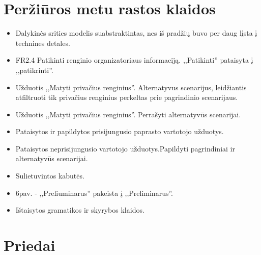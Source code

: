 \documentclass{VUMIFPSkursinis}
\begin{document}
    \section{Peržiūros metu rastos klaidos} \label{klaidos}
		\begin{itemize}
			\item Dalykinės srities modelis suabstraktintas, nes iš pradžių buvo per daug lįsta į technines detales.
			\item FR2.4 Patikinti renginio organizatoriaus informaciją. ,,Patikinti'' pataisyta į ,,patikrinti''.
			\item Užduotis ,,Matyti privačius renginius''. Alternatyvus scenarijus, leidžiantis atfiltruoti tik privačius renginius perkeltas prie pagrindinio scenarijaus.
			\item Užduotis ,,Matyti privačius renginius''. Perrašyti alternatyvūs scenarijai.
			\item Pataisytos ir papildytos prisijungusio paprasto vartotojo užduotys.
			\item Pataisytos neprisijungusio vartotojo užduotys.Papildyti pagrindiniai ir alternatyvūs scenarijai.
			\item Sulietuvintos kabutės.
			\item 6pav. - ,,Preliuminarus'' pakeista į ,,Preliminarus''.
			\item Ištaisytos gramatikos ir skyrybos klaidos.
			
		\end{itemize}
    \section{Priedai}\label{priedai}
\end{document}
